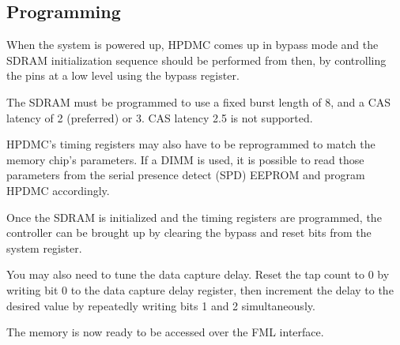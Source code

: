 \documentclass[a4paper,11pt]{article}
\begin{document}
\subsection{Programming}
When the system is powered up, HPDMC comes up in bypass mode and the SDRAM initialization sequence should be performed from then, by controlling the pins at a low level using the bypass register.

The SDRAM must be programmed to use a fixed burst length of 8, and a CAS latency of 2 (preferred) or 3. CAS latency 2.5 is not supported.

HPDMC's timing registers may also have to be reprogrammed to match the memory chip's parameters. If a DIMM is used, it is possible to read those parameters from the serial presence detect (SPD) EEPROM and program HPDMC accordingly.

Once the SDRAM is initialized and the timing registers are programmed, the controller can be brought up by clearing the bypass and reset bits from the system register.

You may also need to tune the data capture delay. Reset the tap count to 0 by writing bit 0 to the data capture delay register, then increment the delay to the desired value by repeatedly writing bits 1 and 2 simultaneously.

The memory is now ready to be accessed over the FML interface.
\end{document}
